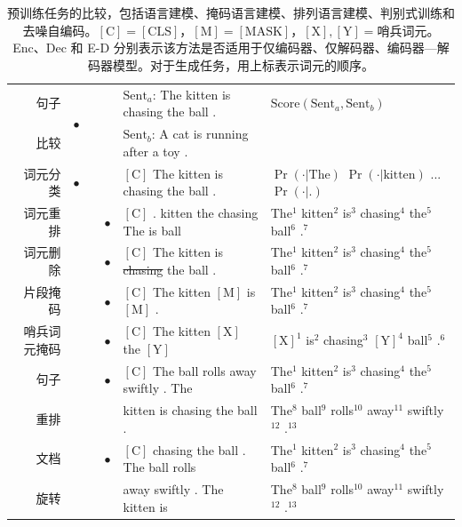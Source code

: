 \begin{table}[!t]
{{\begin{tabular}{r | c | c | c | l | l }
{\color{cyan} 句子} & \multirow{2}{*}{$\bullet$} & & & $\mathrm{Sent}_a$: The kitten is chasing the ball . & $\mathrm{Score}(\mathrm{Sent}_a, \mathrm{Sent}_b)$ \\
{\color{cyan} 比较} & & & & $\mathrm{Sent}_b$: A cat is running after a toy . & \\ \hline
{\color{cyan} 词元分类} & $\bullet$ & & & $\mathrm{[C]}$ The kitten is chasing the ball . & $\Pr(\cdot|\textrm{The})$ $\Pr(\cdot|\textrm{kitten})$ ... $\Pr(\cdot|\textrm{.})$ \\ \hline \hline
{\color{orange} 词元重排} & & & $\bullet$ & $\mathrm{[C]}$ . kitten the chasing The is ball & The$^1$ kitten$^2$ is$^3$ chasing$^4$ the$^5$ ball$^6$ .$^7$ \\ \hline
{\color{orange} 词元删除} & & & $\bullet$ & $\mathrm{[C]}$ The kitten is {\color{gray} \sout{chasing}} the ball . & The$^1$ kitten$^2$ is$^3$ chasing$^4$ the$^5$ ball$^6$ .$^7$ \\ \hline
{\color{orange} 片段掩码} & & & $\bullet$ & $\mathrm{[C]}$ The kitten $\mathrm{[M]}$ is $\mathrm{[M]}$ . & The$^1$ kitten$^2$ is$^3$ chasing$^4$ the$^5$ ball$^6$ .$^7$  \\ \hline
{\color{orange} 哨兵词元掩码} & & & $\bullet$ & $\mathrm{[C]}$ The kitten $\mathrm{[X]}$ the $\mathrm{[Y]}$ & $\mathrm{[X]}^1$ is$^2$ chasing$^3$ $\mathrm{[Y]}^4$ ball$^5$ .$^6$  \\ \hline
{\color{orange} 句子} & & & $\bullet$ & $\mathrm{[C]}$ The ball rolls away swiftly . The & The$^1$ kitten$^2$ is$^3$ chasing$^4$ the$^5$ ball$^6$ .$^7$ \\
{\color{orange} 重排} & & & &  kitten is chasing the ball . & The$^8$ ball$^9$ rolls$^{10}$ away$^{11}$ swiftly$^{12}$ .$^{13}$ \\ \hline
{\color{orange} 文档} & & & $\bullet$ & $\mathrm{[C]}$ chasing the ball . The ball rolls & The$^1$ kitten$^2$ is$^3$ chasing$^4$ the$^5$ ball$^6$ .$^7$ \\
{\color{orange} 旋转} & & & &  away swiftly . The kitten is & The$^8$ ball$^9$ rolls$^{10}$ away$^{11}$ swiftly$^{12}$ .$^{13}$
\end{tabular}
}
} %
\endgroup
\caption{预训练任务的比较，包括{\color{purple}语言建模}、{\color{teal}掩码语言建模}、{\color{brown}排列语言建模}、{\color{cyan}判别式训练}和{\color{orange}去噪自编码}。$\mathrm{[C]} = \mathrm{[CLS]}$，$\mathrm{[M]} = \mathrm{[MASK]}$，$\mathrm{[X]}, \mathrm{[Y]} = \textrm{哨兵词元}$。Enc、Dec 和 E-D 分别表示该方法是否适用于仅编码器、仅解码器、编码器—解码器模型。对于生成任务，用上标表示词元的顺序。}
\label{tab:comparison-of-pre-training-tasks}
\end{table}

